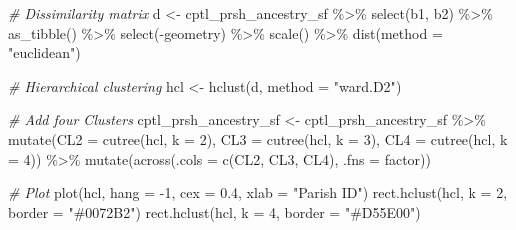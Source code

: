 \documentclass[
  12pt,
]{article}
\newenvironment{Shaded}{\begin{snugshade}}{\end{snugshade}}
\newcommand{\AttributeTok}[1]{\textcolor[rgb]{0.77,0.63,0.00}{#1}}
\newcommand{\CommentTok}[1]{\textcolor[rgb]{0.56,0.35,0.01}{\textit{#1}}}
\newcommand{\DecValTok}[1]{\textcolor[rgb]{0.00,0.00,0.81}{#1}}
\newcommand{\FloatTok}[1]{\textcolor[rgb]{0.00,0.00,0.81}{#1}}
\newcommand{\FunctionTok}[1]{\textcolor[rgb]{0.00,0.00,0.00}{#1}}
\newcommand{\NormalTok}[1]{#1}
\newcommand{\OtherTok}[1]{\textcolor[rgb]{0.56,0.35,0.01}{#1}}
\newcommand{\SpecialCharTok}[1]{\textcolor[rgb]{0.00,0.00,0.00}{#1}}
\newcommand{\StringTok}[1]{\textcolor[rgb]{0.31,0.60,0.02}{#1}}
\begin{document}
\begin{Shaded}
\begin{Highlighting}[]
\CommentTok{\# Dissimilarity matrix}
\NormalTok{d }\OtherTok{\textless{}{-}}\NormalTok{ cptl\_prsh\_ancestry\_sf }\SpecialCharTok{\%\textgreater{}\%} 
  \FunctionTok{select}\NormalTok{(b1, b2) }\SpecialCharTok{\%\textgreater{}\%} 
  \FunctionTok{as\_tibble}\NormalTok{() }\SpecialCharTok{\%\textgreater{}\%} 
  \FunctionTok{select}\NormalTok{(}\SpecialCharTok{{-}}\NormalTok{geometry) }\SpecialCharTok{\%\textgreater{}\%} 
  \FunctionTok{scale}\NormalTok{() }\SpecialCharTok{\%\textgreater{}\%} 
  \FunctionTok{dist}\NormalTok{(}\AttributeTok{method =} \StringTok{"euclidean"}\NormalTok{)}

\CommentTok{\# Hierarchical clustering}
\NormalTok{hcl }\OtherTok{\textless{}{-}} \FunctionTok{hclust}\NormalTok{(d, }\AttributeTok{method =} \StringTok{"ward.D2"}\NormalTok{)}

\CommentTok{\# Add four Clusters}
\NormalTok{cptl\_prsh\_ancestry\_sf }\OtherTok{\textless{}{-}}\NormalTok{ cptl\_prsh\_ancestry\_sf }\SpecialCharTok{\%\textgreater{}\%}
  \FunctionTok{mutate}\NormalTok{(}\AttributeTok{CL2 =} \FunctionTok{cutree}\NormalTok{(hcl, }\AttributeTok{k =} \DecValTok{2}\NormalTok{),}
         \AttributeTok{CL3 =} \FunctionTok{cutree}\NormalTok{(hcl, }\AttributeTok{k =} \DecValTok{3}\NormalTok{),}
         \AttributeTok{CL4 =} \FunctionTok{cutree}\NormalTok{(hcl, }\AttributeTok{k =} \DecValTok{4}\NormalTok{)) }\SpecialCharTok{\%\textgreater{}\%} 
  \FunctionTok{mutate}\NormalTok{(}\FunctionTok{across}\NormalTok{(}\AttributeTok{.cols =} \FunctionTok{c}\NormalTok{(CL2, CL3, CL4), }\AttributeTok{.fns =}\NormalTok{ factor))}
\end{Highlighting}
\end{Shaded}

\begin{Shaded}
\begin{Highlighting}[]
\CommentTok{\# Plot}
\FunctionTok{plot}\NormalTok{(hcl, }\AttributeTok{hang =} \SpecialCharTok{{-}}\DecValTok{1}\NormalTok{, }\AttributeTok{cex =} \FloatTok{0.4}\NormalTok{, }\AttributeTok{xlab =} \StringTok{"Parish ID"}\NormalTok{)}
\FunctionTok{rect.hclust}\NormalTok{(hcl, }\AttributeTok{k =} \DecValTok{2}\NormalTok{, }\AttributeTok{border =} \StringTok{"\#0072B2"}\NormalTok{)}
\FunctionTok{rect.hclust}\NormalTok{(hcl, }\AttributeTok{k =} \DecValTok{4}\NormalTok{, }\AttributeTok{border =} \StringTok{"\#D55E00"}\NormalTok{)}
\end{Highlighting}
\end{Shaded}
\end{document}
